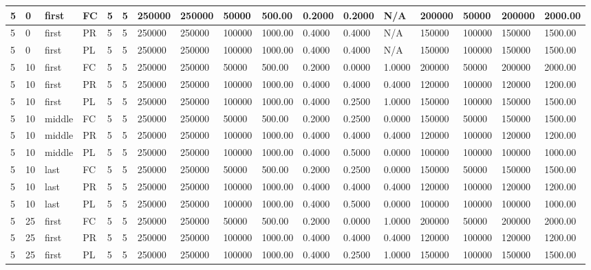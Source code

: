 \begin{tabular}{|l|l|l|l|l|l|l|l|l|l|l|l|l|l|l|l|l|}
5 & 0 & first & FC & 5 & 5 & 250000 & 250000 & 50000 & 500.00 & 0.2000 & 0.2000 & N/A & 200000 & 50000 & 200000 & 2000.00 \\ \hline
5 & 0 & first & PR & 5 & 5 & 250000 & 250000 & 100000 & 1000.00 & 0.4000 & 0.4000 & N/A & 150000 & 100000 & 150000 & 1500.00 \\ \hline
5 & 0 & first & PL & 5 & 5 & 250000 & 250000 & 100000 & 1000.00 & 0.4000 & 0.4000 & N/A & 150000 & 100000 & 150000 & 1500.00 \\ \hline
5 & 10 & first & FC & 5 & 5 & 250000 & 250000 & 50000 & 500.00 & 0.2000 & 0.0000 & 1.0000 & 200000 & 50000 & 200000 & 2000.00 \\ \hline
5 & 10 & first & PR & 5 & 5 & 250000 & 250000 & 100000 & 1000.00 & 0.4000 & 0.4000 & 0.4000 & 120000 & 100000 & 120000 & 1200.00 \\ \hline
5 & 10 & first & PL & 5 & 5 & 250000 & 250000 & 100000 & 1000.00 & 0.4000 & 0.2500 & 1.0000 & 150000 & 100000 & 150000 & 1500.00 \\ \hline
5 & 10 & middle & FC & 5 & 5 & 250000 & 250000 & 50000 & 500.00 & 0.2000 & 0.2500 & 0.0000 & 150000 & 50000 & 150000 & 1500.00 \\ \hline
5 & 10 & middle & PR & 5 & 5 & 250000 & 250000 & 100000 & 1000.00 & 0.4000 & 0.4000 & 0.4000 & 120000 & 100000 & 120000 & 1200.00 \\ \hline
5 & 10 & middle & PL & 5 & 5 & 250000 & 250000 & 100000 & 1000.00 & 0.4000 & 0.5000 & 0.0000 & 100000 & 100000 & 100000 & 1000.00 \\ \hline
5 & 10 & last & FC & 5 & 5 & 250000 & 250000 & 50000 & 500.00 & 0.2000 & 0.2500 & 0.0000 & 150000 & 50000 & 150000 & 1500.00 \\ \hline
5 & 10 & last & PR & 5 & 5 & 250000 & 250000 & 100000 & 1000.00 & 0.4000 & 0.4000 & 0.4000 & 120000 & 100000 & 120000 & 1200.00 \\ \hline
5 & 10 & last & PL & 5 & 5 & 250000 & 250000 & 100000 & 1000.00 & 0.4000 & 0.5000 & 0.0000 & 100000 & 100000 & 100000 & 1000.00 \\ \hline
5 & 25 & first & FC & 5 & 5 & 250000 & 250000 & 50000 & 500.00 & 0.2000 & 0.0000 & 1.0000 & 200000 & 50000 & 200000 & 2000.00 \\ \hline
5 & 25 & first & PR & 5 & 5 & 250000 & 250000 & 100000 & 1000.00 & 0.4000 & 0.4000 & 0.4000 & 120000 & 100000 & 120000 & 1200.00 \\ \hline
5 & 25 & first & PL & 5 & 5 & 250000 & 250000 & 100000 & 1000.00 & 0.4000 & 0.2500 & 1.0000 & 150000 & 100000 & 150000 & 1500.00 \\ \hline

\end{tabular}
